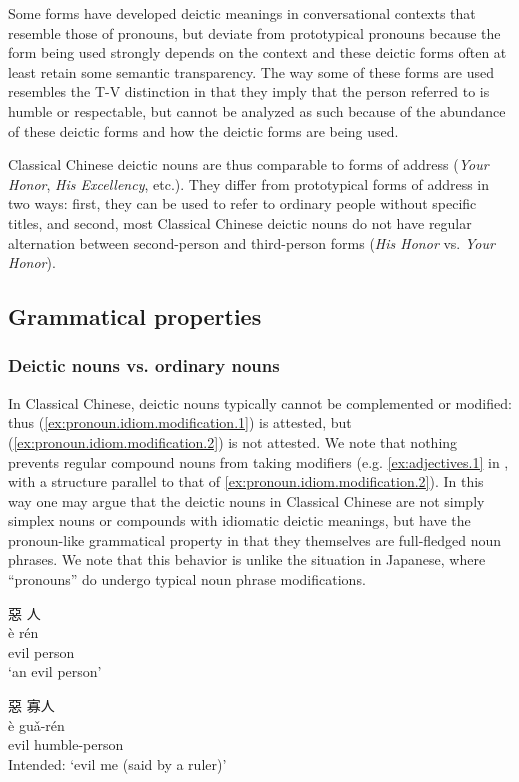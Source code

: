 \documentclass[UTF8, a4paper, oneside, scheme=plain, 12pt]{ctexrep}
\newcommand{\form}[1]{\emph{#1}}
\newcommand{\translate}[1]{`#1'}
\begin{document}
Some forms have developed deictic meanings in conversational contexts that resemble those of pronouns,
but deviate from prototypical pronouns because the form being used strongly depends on the context 
and these deictic forms often at least retain some semantic transparency.
The way some of these forms are used resembles the T-V distinction in that they imply that the person referred to is humble or respectable,
but cannot be analyzed as such because of the abundance of these deictic forms and how the deictic forms are being used.

Classical Chinese deictic nouns are thus comparable to forms of address (\form{Your Honor}, \form{His Excellency}, etc.).
They differ from prototypical forms of address in two ways: first, they can be used to refer to ordinary people without specific titles, and second, most Classical Chinese deictic nouns do not have regular alternation between second-person and third-person forms (\form{His Honor} vs. \form{Your Honor}).

\subsection{Grammatical properties}

\subsubsection{Deictic nouns vs. ordinary nouns}

In Classical Chinese, deictic nouns typically cannot be complemented or modified:
thus (\ref{ex:pronoun.idiom.modification.1}) is attested,
but (\ref{ex:pronoun.idiom.modification.2}) is not attested.
We note that nothing prevents regular compound nouns from taking modifiers (e.g. \ref{ex:adjectives.1} in , with a structure parallel to that of \ref{ex:pronoun.idiom.modification.2}).
In this way one may argue that the deictic nouns in Classical Chinese are not simply simplex nouns or compounds with idiomatic deictic meanings,
but have the pronoun-like grammatical property in that they themselves are full-fledged noun phrases.
We note that this behavior is unlike the situation in Japanese,
where ``pronouns'' do undergo typical noun phrase modifications.

\begin{exe}
    \ex \begin{xlist}
        \ex\label{ex:pronoun.idiom.modification.1}
        \glll 惡 人 \\
        è rén \\
        evil person \\
        \glt\translate{an evil person}

        \ex\label{ex:pronoun.idiom.modification.2}
        \glll *惡 寡人 \\
        è guǎ-rén \\
        evil humble-person \\
        \glt Intended: \translate{evil me (said by a ruler)}
    \end{xlist}
\end{exe}
\end{document}

